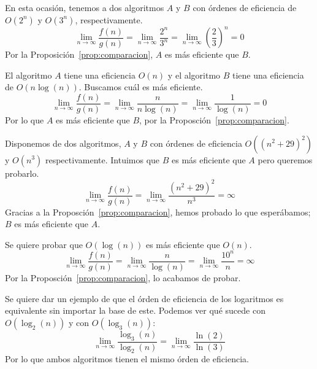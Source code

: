\begin{ejemplo}
En esta ocasión, tenemos a dos algoritmos $A$ y $B$ con órdenes de eficiencia de $O(2^n)$ y $O(3^n)$, respectivamente.
\begin{equation*}
\lim_{n\to\infty}\dfrac{f(n)}{g(n)} = \lim_{n\to\infty}\dfrac{2^n}{3^n}=\lim_{n\to\infty}\left(\dfrac{2}{3}\right)^n = 0
\end{equation*}
Por la Proposición~\ref{prop:comparacion}, $A$ es más eficiente que $B$.
\end{ejemplo}

\begin{ejemplo}
El algoritmo $A$ tiene una eficiencia $O(n)$ y el algoritmo $B$ tiene una eficiencia de $O(n\log(n))$. Buscamos cuál es más eficiente.
\begin{equation*}
\lim_{n\to\infty}\dfrac{f(n)}{g(n)}=\lim_{n\to\infty}\dfrac{n}{n\log(n)}=\lim_{n\to\infty}\dfrac{1}{\log(n)} = 0
\end{equation*}
Por lo que $A$ es más eficiente que $B$, por la Proposción~\ref{prop:comparacion}.
\end{ejemplo}

\begin{ejemplo}
Disponemos de dos algoritmos, $A$ y $B$ con órdenes de eficiencia $O((n^2+29)^2)$ y $O(n^3)$ respectivamente. Intuimos que $B$ es más eficiente que $A$ pero queremos probarlo.
\begin{equation*}
\lim_{n\to\infty}\dfrac{f(n)}{g(n)} = \lim_{n\to\infty}\dfrac{(n^2+29)^2}{n^3} = \infty
\end{equation*}
Gracias a la Proposción~\ref{prop:comparacion}, hemos probado lo que esperábamos; $B$ es más eficiente que $A$.
\end{ejemplo}

\begin{ejemplo}
Se quiere probar que $O(\log(n))$ es más eficiente que $O(n)$.
\begin{equation*}
\lim_{n\to\infty}\dfrac{f(n)}{g(n)} = \lim_{n\to\infty}\dfrac{n}{\log(n)} = \lim_{n\to\infty}\dfrac{10^n}{n} = \infty
\end{equation*}
Por la Proposción~\ref{prop:comparacion}, lo acabamos de probar.
\end{ejemplo}

\begin{ejemplo}
Se quiere dar un ejemplo de que el órden de eficiencia de los logaritmos es equivalente sin importar la base de este. Podemos ver qué sucede con $O(\log_2(n))$ y con $O(\log_3(n))$:
\begin{equation*}
\lim_{n\to\infty}\dfrac{\log_3(n)}{\log_2(n)} = \lim_{n\to\infty}\dfrac{\ln(2)}{\ln(3)}
\end{equation*}
Por lo que ambos algoritmos tienen el mismo órden de eficiencia.
\end{ejemplo}

